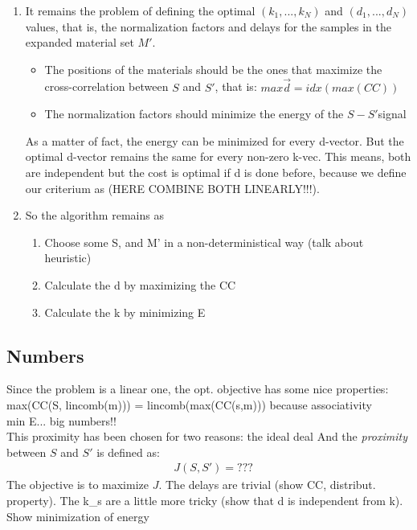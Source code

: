 \documentclass[11pt]{scrartcl} %
\begin{document}
\begin{enumerate}
  \item It remains the problem of defining the optimal \((k_1, ..., k_N)\) and \((d_1, ..., d_N)\) values, that is, the normalization factors and delays for the samples in the expanded material set \(M'\).
      \begin{itemize}
      \item The positions of the materials should be the ones that maximize the cross-correlation between \(S\) and \(S'\), that is: \(max \vec{d} = idx(max(CC))\)
      \item The normalization factors should minimize the energy of the \(S-S'\)signal
      \end{itemize}
      As a matter of fact, the energy can be minimized for every d-vector. But the optimal d-vector remains the same for every non-zero k-vec. This means, both are independent but the cost is optimal if d is done before, because we define our criterium as (HERE COMBINE BOTH LINEARLY!!!).
    \item So the algorithm remains as
      \begin{enumerate}
      \item Choose some S, and M' in a non-deterministical way (talk about heuristic)
      \item Calculate the d by maximizing the CC
      \item Calculate the k by minimizing E
      \end{enumerate}
  \end{enumerate}
  \subsection*{Numbers}
  Since the problem is a linear one, the opt. objective has some nice properties:\\
  max(CC(S, lincomb(m))) = lincomb(max(CC(s,m))) because associativity\\
  min E... big numbers!!\\
  This proximity has been chosen for two reasons: the ideal deal
  And the {\it proximity} between \(S\) and \(S'\) is defined as:
  \begin{align*}
    &J(S, S') = ???
  \end{align*}
  The objective is to maximize \(J\). The delays are trivial (show CC, distribut. property). The k_s are a little more tricky (show that d is independent from k). Show minimization of energy
  
\end{document}
